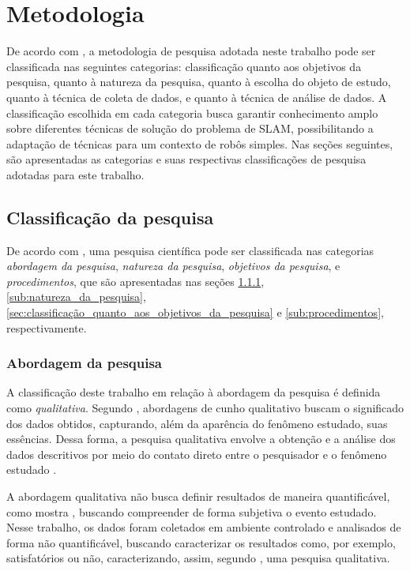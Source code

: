 \chapter[Metodologia]{Metodologia}

	De acordo com \cite{metodologiaCientifica}, a metodologia de pesquisa adotada neste trabalho pode ser classificada nas seguintes categorias: classificação quanto aos objetivos da pesquisa, quanto à natureza da pesquisa, quanto à escolha do objeto de estudo, quanto à técnica de coleta de dados, e quanto à técnica de análise de dados. A classificação escolhida em cada categoria busca garantir conhecimento amplo sobre diferentes técnicas de solução do problema de SLAM, possibilitando a adaptação de técnicas para um contexto de robôs simples. Nas seções seguintes, são apresentadas as categorias e suas respectivas classificações de pesquisa adotadas para este trabalho.

	\section{Classificação da pesquisa} %
	\label{sec:classificação_da_pesquisa}

		De acordo com \cite{metodologia}, uma pesquisa científica pode ser classificada nas categorias \textit{abordagem da pesquisa}, \textit{natureza da pesquisa}, \textit{objetivos da pesquisa}, e \textit{procedimentos}, que são apresentadas nas seções \ref{sub:abordagem_da_pesquisa}, \ref{sub:natureza_da_pesquisa}, \ref{sec:classificação_quanto_aos_objetivos_da_pesquisa} e \ref{sub:procedimentos}, respectivamente.



		\subsection{Abordagem da pesquisa} %
		\label{sub:abordagem_da_pesquisa}

			A classificação deste trabalho em relação à abordagem da pesquisa é definida como \textit{qualitativa}. Segundo \cite{metodologiaCientifica}, abordagens de cunho qualitativo buscam o significado dos dados obtidos, capturando, além da aparência do fenômeno estudado, suas essências. Dessa forma, a pesquisa qualitativa envolve a obtenção e a análise dos dados descritivos por meio do contato direto entre o pesquisador e o fenômeno estudado \cite{metodologiaCientifica}.

			A abordagem qualitativa não busca definir resultados de maneira quantificável, como mostra \cite{metodologia}, buscando compreender de forma subjetiva o evento estudado. Nesse trabalho, os dados foram coletados em ambiente controlado e analisados de forma não quantificável, buscando caracterizar os resultados como, por exemplo, satisfatórios ou não, caracterizando, assim, segundo \cite{metodologia}, uma pesquisa qualitativa.

